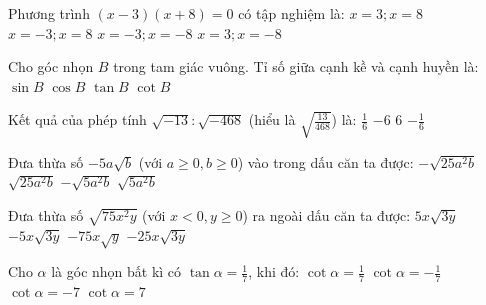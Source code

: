 \documentclass[12pt,a4paper]{article}
\begin{document}
\begin{ex}
Phương trình $(x - 3)(x + 8) = 0$ có tập nghiệm là:
\choice
{$x = 3; x = 8$}
{$x = -3; x = 8$}
{$x = -3; x = -8$}
{\True $x = 3; x = -8$}
\end{ex}

\begin{ex}
Cho góc nhọn $B$ trong tam giác vuông. Tỉ số giữa cạnh kề và cạnh huyền là:
\choice
{$\sin B$}
{\True $\cos B$}
{$\tan B$}
{$\cot B$}
\end{ex}

\begin{ex}
Kết quả của phép tính $\sqrt{-13} : \sqrt{-468}$ (hiểu là $\sqrt{\frac{13}{468}}$) là:
\choice
{\True $\frac{1}{6}$}
{$-6$}
{$6$}
{$-\frac{1}{6}$}
\end{ex}

\begin{ex}
Đưa thừa số $-5a\sqrt{b}$ (với $a \ge 0, b \ge 0$) vào trong dấu căn ta được:
\choice
{\True $-\sqrt{25a^2 b}$}
{$\sqrt{25a^2 b}$}
{$-\sqrt{5a^2 b}$}
{$\sqrt{5a^2 b}$}
\end{ex}

\begin{ex}
Đưa thừa số $\sqrt{75x^2 y}$ (với $x < 0, y \ge 0$) ra ngoài dấu căn ta được:
\choice
{$5x\sqrt{3y}$}
{\True $-5x\sqrt{3y}$}
{$-75x\sqrt{y}$}
{$-25x\sqrt{3y}$}
\end{ex}

\begin{ex}
Cho $\alpha$ là góc nhọn bất kì có $\tan \alpha = \frac{1}{7}$, khi đó:
\choice
{$\cot \alpha = \frac{1}{7}$}
{$\cot \alpha = -\frac{1}{7}$}
{$\cot \alpha = -7$}
{\True $\cot \alpha = 7$}
\end{ex}
\end{document}
